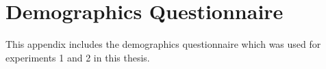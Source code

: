 \chapter{Demographics Questionnaire}\label{app:demographicsQuestionnaire}
This appendix includes the demographics questionnaire which was used for experiments 1 and 2 in this thesis. 

